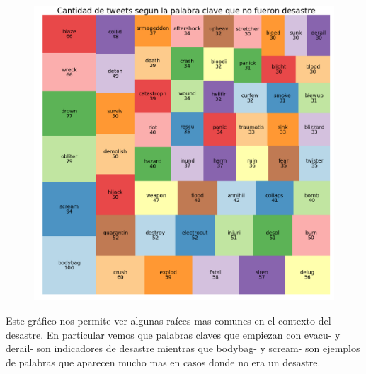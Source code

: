 \documentclass[titlepage,a4paper]{article}
\begin{document}
{\begin{figure}[H]
\end{figure}
\begin{figure}[H]
 \centering
 \includegraphics[width=1\textwidth, height=1\textheight, keepaspectratio]{graficos/cantidad_tweets_palabra_clave_2.png}
\end{figure}
Este gráfico nos permite ver algunas raíces mas comunes en el contexto del desastre. En particular vemos que palabras claves que empiezan con evacu- y derail- son indicadores de desastre mientras que bodybag- y scream- son ejemplos de palabras que aparecen mucho mas en casos donde no era un desastre.
\par}
\end{document}
